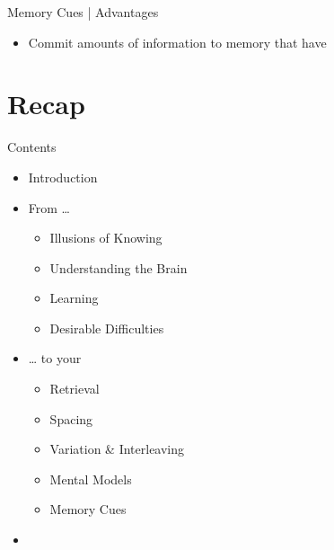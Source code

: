 \documentclass{ercisbeamer}
\begin{document}
\begin{frame}{Memory Cues | Advantages}
    \begin{itemize}
        \item Commit  amounts of information to memory that have 
    \end{itemize}
\end{frame}

\section{Recap}
\begin{frame}{Contents}
    \begin{itemize}
        \item Introduction
        \item From …
        \begin{itemize}
            \item Illusions of Knowing
            \item Understanding the Brain
            \item Learning
            \item Desirable Difficulties
        \end{itemize}
        \item … to your 
        \begin{itemize}
            \item Retrieval
            \item Spacing
            \item Variation \& Interleaving
            \item Mental Models
            \item Memory Cues
        \end{itemize}
        \item {}
    \end{itemize}
\end{frame}
\end{document}
